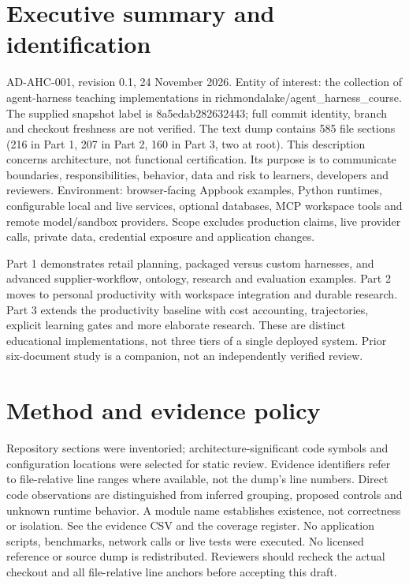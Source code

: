 \documentclass[10pt,letterpaper]{article}
\begin{document}
\makedoctitle
\tableofcontents
\listoffigures
\clearpage
\section{Executive summary and identification}
AD-AHC-001, revision 0.1, 24 November 2026. Entity of interest: the collection of agent-harness teaching implementations in richmondalake/agent\_harness\_course. The supplied snapshot label is 8a5edab282632443; full commit identity, branch and checkout freshness are not verified. The text dump contains 585 file sections (216 in Part 1, 207 in Part 2, 160 in Part 3, two at root). This description concerns architecture, not functional certification. Its purpose is to communicate boundaries, responsibilities, behavior, data and risk to learners, developers and reviewers. Environment: browser-facing Appbook examples, Python runtimes, configurable local and live services, optional databases, MCP workspace tools and remote model/sandbox providers. Scope excludes production claims, live provider calls, private data, credential exposure and application changes.

Part 1 demonstrates retail planning, packaged versus custom harnesses, and advanced supplier-workflow, ontology, research and evaluation examples. Part 2 moves to personal productivity with workspace integration and durable research. Part 3 extends the productivity baseline with cost accounting, trajectories, explicit learning gates and more elaborate research. These are distinct educational implementations, not three tiers of a single deployed system. Prior six-document study is a companion, not an independently verified review.

\section{Method and evidence policy}
Repository sections were inventoried; architecture-significant code symbols and configuration locations were selected for static review. Evidence identifiers refer to file-relative line ranges where available, not the dump's line numbers. Direct code observations are distinguished from inferred grouping, proposed controls and unknown runtime behavior. A module name establishes existence, not correctness or isolation. See the evidence CSV and the coverage register. No application scripts, benchmarks, network calls or live tests were executed. No licensed reference or source dump is redistributed. Reviewers should recheck the actual checkout and all file-relative line anchors before accepting this draft.
\end{document}
